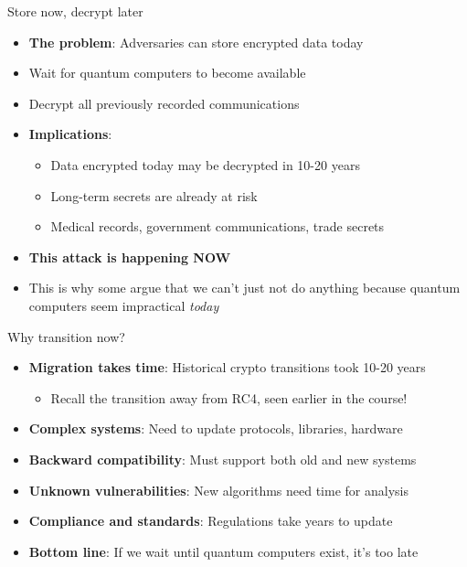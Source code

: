 \documentclass[aspectratio=169, lualatex, handout]{beamer}
\begin{document}
\begin{frame}{Store now, decrypt later}
	\begin{itemize}
		\item \textbf{The problem}: Adversaries can store encrypted data today
		\item Wait for quantum computers to become available
		\item Decrypt all previously recorded communications
		\item \textbf{Implications}:
		      \begin{itemize}
			      \item Data encrypted today may be decrypted in 10-20 years
			      \item Long-term secrets are already at risk
			      \item Medical records, government communications, trade secrets
		      \end{itemize}
		\item \textbf{This attack is happening NOW}
		\item This is why some argue that we can't just not do anything because quantum computers seem impractical \textit{today}
	\end{itemize}
\end{frame}

\begin{frame}{Why transition now?}
	\begin{itemize}
		\item \textbf{Migration takes time}: Historical crypto transitions took 10-20 years
		      \begin{itemize}
			      \item Recall the transition away from RC4, seen earlier in the course!
		      \end{itemize}
		\item \textbf{Complex systems}: Need to update protocols, libraries, hardware
		\item \textbf{Backward compatibility}: Must support both old and new systems
		\item \textbf{Unknown vulnerabilities}: New algorithms need time for analysis
		\item \textbf{Compliance and standards}: Regulations take years to update
		\item \textbf{Bottom line}: If we wait until quantum computers exist, it's too late
	\end{itemize}
\end{frame}
\end{document}
